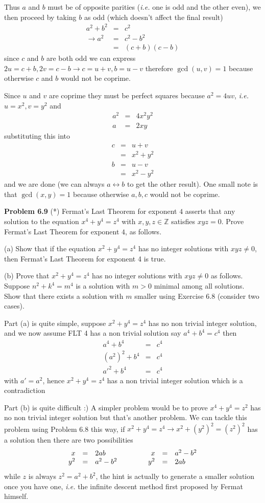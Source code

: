 \documentclass[aps,preprint,preprintnumbers,nofootinbib,showpacs,prd]{revtex4-1}
\newcommand{\ie}{{\it i.e.} }
\newcommand{\nbea}{\begin{eqnarray*}}
\newcommand{\neea}{\end{eqnarray*}}
\begin{document}
Thus $a$ and $b$ must be of opposite parities (\ie one is odd and the other even), we then proceed by taking $b$ as odd (which doesn't affect the final result)
%
\nbea
a^2 + b^2 & = & c^2 \\
\to a^2 & = & c^2 - b^2 \\
& = & (c + b)(c - b)
\neea
%
since $c$ and $b$ are both odd we can express $2u = c+b, 2v = c-b \to c = u+v, b = u - v$ therefore $\gcd(u,v)=1$ because otherwise $c$ and $b$ would not be coprime.

Since $u$ and $v$ are coprime they must be perfect squares because $a^2 = 4uv$, \ie $u = x^2, v = y^2$ and
%
\nbea
a^2 & = & 4x^2y^2 \\
a & = & 2xy
\neea
%
substituting this into
%
\nbea
c & = & u + v \\
& = & x^2 + y^2 \\
b & = & u - v \\
& = & x^2 - y^2
\neea
%
and we are done (we can always $a \leftrightarrow b$ to get the other result). One small note is that $\gcd(x,y)=1$ because otherwise $a,b,c$ would not be coprime.

{\bf Problem 6.9} (*) Fermat's Last Theorem for exponent $4$ asserts that any solution to the equation $x^4 + y^4 = z^4$ with $x, y, z \in \mathbb{Z}$ satisfies $xyz = 0$. Prove Fermat’s Last Theorem for exponent $4$, as follows.

(a) Show that if the equation $x^2 + y^4 = z^4$ has no integer solutions with $xyz \neq 0$, then Fermat’s Last Theorem for exponent 4 is true.

(b) Prove that $x^2 +y^4 = z^4$ has no integer solutions with $xyz \neq 0$ as follows. Suppose $n^2 +k^4 = m^4$ is a solution with $m > 0$ minimal among all solutions. Show that there exists a solution with $m$ smaller using Exercise 6.8 (consider two cases).

Part (a) is quite simple, suppose $x^2 + y^4 = z^4$ has no non trivial integer solution, and we now assume FLT 4 has a non trivial solution say $a^4 + b^4 = c^4$ then
%
\nbea
a^4 + b^4 & = & c^4 \\
(a^2)^2 + b^4 & = & c^4 \\
a'^2 + b^4 & = & c^4
\neea
%
with $a' = a^2$, hence $x^2 + y^4 = z^4$ has a non trivial integer solution which is a contradiction

Part (b) is quite difficult :) A simpler problem would be to prove $x^4 + y^4 = z^2$ has no non trivial integer solution but that's another problem. We can tackle this problem using Problem 6.8 this way, if $x^2 + y^4 = z^4 \to x^2 + (y^2)^2 = (z^2)^2$ has a solution then there are two possibilities
%
\nbea
\begin{array}{r c l c r c l}
x & = & 2ab & ~~~~~~~ & x & = & a^2 - b^2\\
y^2 & = & a^2 - b^2 & ~~~~~~~ & y^2 & = & 2ab
\end{array}
\neea
%
while $z$ is always $z^2 = a^2 + b^2$, the hint is actually to generate a smaller solution once you have one, \ie the infinite descent method first proposed by Fermat himself.
\end{document}
